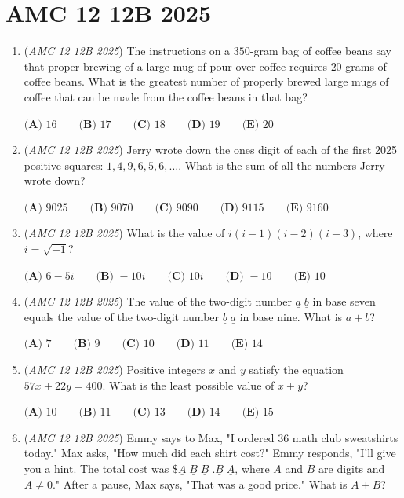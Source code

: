 \section{AMC 12 12B 2025}
        \begin{enumerate}
        	\item (\textit{AMC 12 12B 2025}) The instructions on a $350$-gram bag of coffee beans say that proper brewing of a large mug of pour-over coffee requires $20$ grams of coffee beans. What is the greatest number of properly brewed large mugs of coffee that can be made from the coffee beans in that bag?


 $\textbf{(A) } 16 \qquad\textbf{(B) } 17 \qquad\textbf{(C) } 18 \qquad\textbf{(D) } 19 \qquad\textbf{(E) } 20$


	\item (\textit{AMC 12 12B 2025}) Jerry wrote down the ones digit of each of the first 2025 positive squares: $1,4, 9,6,5,6,\dots$. What is the sum of all the numbers Jerry wrote down?


 $\textbf{(A) } 9025 \qquad\textbf{(B) } 9070 \qquad\textbf{(C) } 9090 \qquad\textbf{(D) } 9115 \qquad\textbf{(E) } 9160$


	\item (\textit{AMC 12 12B 2025}) What is the value of $i(i-1)(i-2)(i-3)$, where $i=\sqrt{-1}$?


 $\textbf{(A) } 6-5i \qquad\textbf{(B) } -10i \qquad\textbf{(C) } 10i \qquad\textbf{(D) } -10 \qquad\textbf{(E) } 10$


	\item (\textit{AMC 12 12B 2025}) The value of the two-digit number $\underline{a}\;\underline{b}$ in base seven equals the value of the two-digit number $\underline{b}\;\underline{a}$ in base nine. What is $a+b$?


 $\textbf{(A) } 7 \qquad\textbf{(B) } 9 \qquad\textbf{(C) } 10 \qquad\textbf{(D) } 11 \qquad\textbf{(E) } 14$


	\item (\textit{AMC 12 12B 2025}) Positive integers $x$ and $y$ satisfy the equation $57x+22y = 400$. What is the least possible value of $x+y$?


 $\textbf{(A) } 10 \qquad\textbf{(B) } 11 \qquad\textbf{(C) } 13 \qquad\textbf{(D) } 14 \qquad\textbf{(E) } 15$


	\item (\textit{AMC 12 12B 2025}) Emmy says to Max, "I ordered $36$ math club sweatshirts today." Max asks, "How much did each shirt cost?" Emmy responds, "I'll give you a hint. The total cost was $\$\underline{A}\;\underline{B}\;\underline{B}\;.\underline{B}\;\underline{A}$, where $A$ and $B$ are digits and $A \neq 0$."  After a pause, Max says, "That was a good price." What is $A+B$?



\end{enumerate}

